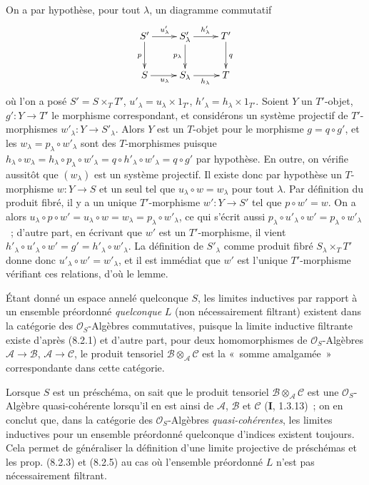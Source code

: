 On a par hypothèse, pour tout $\lambda$, un diagramme commutatif
\[
\xymatrix{
  S' \ar[r]^{u'_\lambda} \ar[d]_p
    & S'_\lambda \ar[r]^{h'_\lambda} \ar[d]_{p_\lambda}
    & T' \ar[d]^q \\
  S \ar[r]_{u_\lambda} & S_\lambda \ar[r]_{h_\lambda} & T
}
\]
où l'on a posé $S'=S\times_T T'$, $u'_\lambda=u_\lambda\times 1_{T'}$,
$h'_\lambda=h_\lambda\times 1_{T'}$. Soient $Y$ un $T'$-objet,
$g':Y\to T'$ le morphisme correspondant, et considérons un système
projectif de $T'$-morphismes $w'_\lambda:Y\to S'_\lambda$. Alors $Y$ est un
$T$-objet pour le morphisme $g=q\circ g'$, et les
$w_\lambda=p_\lambda\circ w'_\lambda$ sont des $T$-morphismes puisque
$h_\lambda\circ w_\lambda=h_\lambda\circ p_\lambda\circ w'_\lambda
=q\circ h'_\lambda\circ w'_\lambda=q\circ g'$ par hypothèse. En outre, on
vérifie aussitôt que $(w_\lambda)$ est un système projectif. Il existe donc
par hypothèse un $T$-morphisme $w:Y\to S$ et un seul tel que
$u_\lambda\circ w=w_\lambda$ pour tout $\lambda$. Par définition du produit
fibré, il y a un unique $T'$-morphisme $w':Y\to S'$ tel que
$p\circ w'=w$. On a alors
$u_\lambda\circ p\circ w'=u_\lambda\circ w=w_\lambda
=p_\lambda\circ w'_\lambda$, ce qui s'écrit aussi
$p_\lambda\circ u'_\lambda\circ w'=p_\lambda\circ w'_\lambda$~; d'autre
part, en écrivant que $w'$ est un $T'$-morphisme, il vient
$h'_\lambda\circ u'_\lambda\circ w'=g'=h'_\lambda\circ w'_\lambda$. La
définition de $S'_\lambda$ comme produit fibré $S_\lambda\times_T T'$ donne
donc $u'_\lambda\circ w'=w'_\lambda$, et il est immédiat que $w'$ est
l'unique $T'$-morphisme vérifiant ces relations, d'où le lemme.

\begin{remark}[8.2.7]
\label{IV.8.2.7-fr}
Étant donné un espace annelé quelconque $S$, les limites inductives par
rapport à un ensemble préordonné \emph{quelconque} $L$ (non nécessairement
filtrant) existent dans la catégorie des $\mathcal O_S$-Algèbres
commutatives, puisque la limite inductive filtrante existe d'après (8.2.1) et
d'autre part, pour deux homomorphismes de $\mathcal O_S$-Algèbres
$\mathscr A\to\mathscr B$, $\mathscr A\to\mathscr C$, le produit tensoriel
$\mathscr B\otimes_{\mathscr A}\mathscr C$ est la «~somme amalgamée~»
correspondante dans cette catégorie.

Lorsque $S$ est un préschéma, on sait que le produit tensoriel
$\mathscr B\otimes_{\mathscr A}\mathscr C$ est une $\mathcal O_S$-Algèbre
quasi-cohérente lorsqu'il en est ainsi de $\mathscr A$, $\mathscr B$ et
$\mathscr C$ (\textbf{I}, 1.3.13)~; on en conclut que, dans la catégorie des
$\mathcal O_S$-Algèbres \emph{quasi-cohérentes}, les limites inductives pour
un ensemble préordonné quelconque d'indices existent toujours. Cela permet de
généraliser la définition d'une limite projective de préschémas et les prop.
(8.2.3) et (8.2.5) au cas où l'ensemble préordonné $L$ n'est pas
nécessairement filtrant.
\end{remark}

